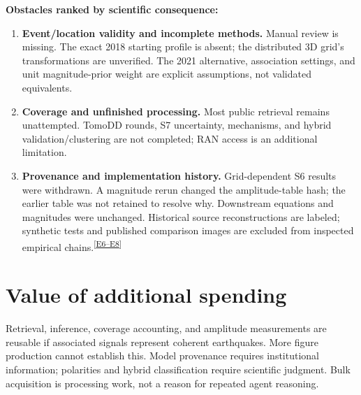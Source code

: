\documentclass[10pt]{article}
\newcommand{\ev}[1]{\textsuperscript{[\hyperref[app:evidence]{#1}]}}
\begin{document}
\textbf{Obstacles ranked by scientific consequence:}
\begin{enumerate}\setlength{\itemsep}{0pt}
\item \textbf{Event/location validity and incomplete methods.} Manual review is missing. The exact 2018 starting profile is absent; the distributed 3D grid's transformations are unverified. The 2021 alternative, association settings, and unit magnitude-prior weight are explicit assumptions, not validated equivalents.
\item \textbf{Coverage and unfinished processing.} Most public retrieval remains unattempted. TomoDD rounds, S7 uncertainty, mechanisms, and hybrid validation/clustering are not completed; RAN access is an additional limitation.
\item \textbf{Provenance and implementation history.} Grid-dependent S6 results were withdrawn. A magnitude rerun changed the amplitude-table hash; the earlier table was not retained to resolve why. Downstream equations and magnitudes were unchanged. Historical source reconstructions are labeled; synthetic tests and published comparison images are excluded from inspected empirical chains.\ev{E6--E8}
\end{enumerate}

\clearpage
\section*{Value of additional spending}
Retrieval, inference, coverage accounting, and amplitude measurements are reusable if associated signals represent coherent earthquakes. More figure production cannot establish this. Model provenance requires institutional information; polarities and hybrid classification require scientific judgment. Bulk acquisition is processing work, not a reason for repeated agent reasoning.
\end{document}
